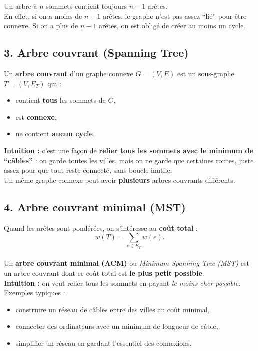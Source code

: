 Un arbre à \( n \) sommets contient toujours \( n-1 \) arêtes. \\
En effet, si on a moins de \( n-1 \) arêtes, le graphe n’est pas assez “lié” pour être connexe. Si on a plus de \( n-1 \) arêtes, on est obligé de créer au moins un cycle. 

\subsection*{3. Arbre couvrant (Spanning Tree)}

Un \textbf{arbre couvrant} d’un graphe connexe \( G = (V, E) \) est un sous-graphe \( T = (V, E_T) \) qui :
\begin{itemize}
    \item contient \textbf{tous} les sommets de \( G \),
    \item est \textbf{connexe},
    \item ne contient \textbf{aucun cycle}.
\end{itemize}

\textbf{Intuition :} c’est une façon de \textbf{relier tous les sommets avec le minimum de “câbles”} : on garde toutes les villes, mais on ne garde que certaines routes, juste assez pour que tout reste connecté, sans boucle inutile. \\

Un même graphe connexe peut avoir \textbf{plusieurs} arbres couvrants différents. 

\subsection*{4. Arbre couvrant minimal (MST)}

Quand les arêtes sont pondérées, on s’intéresse au \textbf{coût total} :
\[
w(T) = \sum_{e \in E_T} w(e).
\] \\

Un \textbf{arbre couvrant minimal (ACM)} ou \emph{Minimum Spanning Tree (MST)} est un arbre couvrant dont ce coût total est \textbf{le plus petit possible}. \\

\textbf{Intuition :} on veut relier tous les sommets en payant \emph{le moins cher possible}. \\
Exemples typiques :
\begin{itemize}
    \item construire un réseau de câbles entre des villes au coût minimal,
    \item connecter des ordinateurs avec un minimum de longueur de câble,
    \item simplifier un réseau en gardant l’essentiel des connexions.
\end{itemize}


